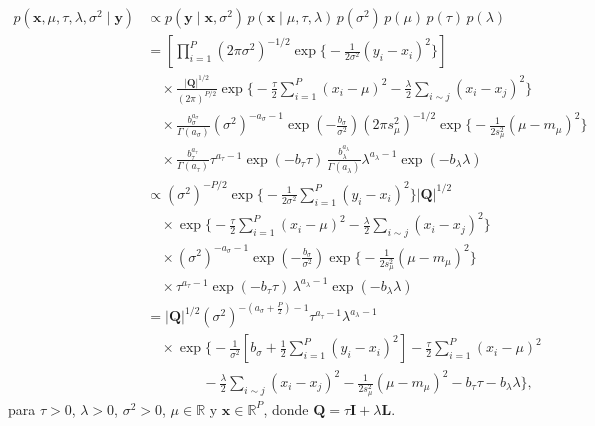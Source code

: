 \documentclass[11pt,a4paper]{article}
\begin{document}
\begin{align*}
p(\boldsymbol{x}, \mu, \tau, \lambda, \sigma^2 \mid \boldsymbol{y})
&\propto p(\boldsymbol{y} \mid \boldsymbol{x}, \sigma^2)\, p(\boldsymbol{x} \mid \mu, \tau, \lambda)\, p(\sigma^2)\, p(\mu)\, p(\tau)\, p(\lambda) \\[6pt]
&= \left[ \prod_{i=1}^{P} (2\pi\sigma^2)^{-1/2} \exp\Big\{ -\frac{1}{2\sigma^2}(y_i - x_i)^2 \Big\} \right] \\
&\quad \times \frac{|\mathbf{Q}|^{1/2}}{(2\pi)^{P/2}} \exp\Big\{ -\frac{\tau}{2}\sum_{i=1}^{P}(x_i - \mu)^2 - \frac{\lambda}{2}\sum_{i \sim j}(x_i - x_j)^2 \Big\} \\
&\quad \times \frac{b_\sigma^{a_\sigma}}{\Gamma(a_\sigma)} (\sigma^2)^{-a_\sigma - 1} \exp\left(-\frac{b_\sigma}{\sigma^2}\right) (2\pi s_\mu^2)^{-1/2} \exp\Big\{ -\frac{1}{2s_\mu^2}(\mu - m_\mu)^2 \Big\} \\
&\quad \times \frac{b_\tau^{a_\tau}}{\Gamma(a_\tau)} \tau^{a_\tau - 1} \exp(-b_\tau \tau) \, \frac{b_\lambda^{a_\lambda}}{\Gamma(a_\lambda)} \lambda^{a_\lambda - 1} \exp(-b_\lambda \lambda) \\[6pt]
&\propto (\sigma^2)^{-P/2} \exp\Big\{ -\frac{1}{2\sigma^2}\sum_{i=1}^{P}(y_i - x_i)^2 \Big\} |\mathbf{Q}|^{1/2} \\
&\quad \times \exp\Big\{ -\frac{\tau}{2}\sum_{i=1}^{P}(x_i - \mu)^2 - \frac{\lambda}{2}\sum_{i \sim j}(x_i - x_j)^2 \Big\} \\
&\quad \times (\sigma^2)^{-a_\sigma - 1} \exp\left(-\frac{b_\sigma}{\sigma^2}\right) \exp\Big\{ -\frac{1}{2s_\mu^2}(\mu - m_\mu)^2 \Big\} \\
&\quad \times \tau^{a_\tau - 1} \exp(-b_\tau \tau) \, \lambda^{a_\lambda - 1} \exp(-b_\lambda \lambda) \\[6pt]
&= |\mathbf{Q}|^{1/2} (\sigma^2)^{-\left(a_\sigma + \frac{P}{2}\right) - 1} \tau^{a_\tau - 1} \lambda^{a_\lambda - 1} \\
&\quad \times \exp\Big\{ -\frac{1}{\sigma^2}\left[ b_\sigma + \frac{1}{2}\sum_{i=1}^{P}(y_i - x_i)^2 \right] - \frac{\tau}{2}\sum_{i=1}^{P}(x_i - \mu)^2 \\
&\qquad\qquad - \frac{\lambda}{2}\sum_{i \sim j}(x_i - x_j)^2 - \frac{1}{2s_\mu^2}(\mu - m_\mu)^2 - b_\tau \tau - b_\lambda \lambda \Big\},
\end{align*}
para $\tau > 0$, $\lambda > 0$, $\sigma^2 > 0$, $\mu \in \mathbb{R}$ y $\boldsymbol{x} \in \mathbb{R}^P$, donde $\mathbf{Q} = \tau\mathbf{I} + \lambda\mathbf{L}$.

\end{document}
